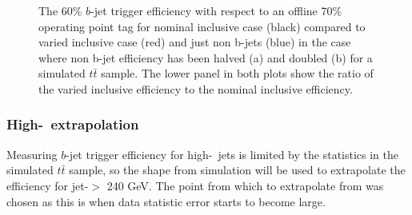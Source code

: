 \begin{figure}[!ht]
  \begin{center}
    \captionsetup[subfigure]{aboveskip=0pt,justification=centering}
  \end{center}
  \caption{The 60\% $b$-jet trigger efficiency with respect to an offline 70\% operating point tag
    for nominal inclusive case (black) compared to varied inclusive case (red) and just non b-jets (blue)
    in the case where non b-jet efficiency has been halved (a) and doubled (b) for a simulated $t\bar{t}$ sample.
    The lower panel in both plots show the ratio of the varied inclusive efficiency to the nominal inclusive efficiency.
  }
  \label{fig:Eff_LTrigEff}
\end{figure}

\FloatBarrier

\subsubsection{High-\pT~extrapolation}
\label{sec:trig-highPtExtrap}

Measuring $b$-jet trigger efficiency for high-\pT~jets is limited by the statistics in the simulated $t\bar{t}$ sample,
so the shape from simulation will be used to extrapolate the efficiency for jet-\pT $>$ 240 GeV.
The point from which to extrapolate from was chosen as this is when data statistic error starts to become large. 

